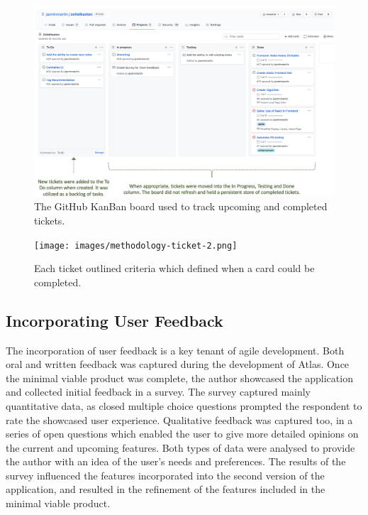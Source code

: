 \documentclass{article}
\begin{document}
\begin{figure}[!htb]
  \centering
      \includegraphics[width=1\textwidth]{images/methodology-ticket.png}
  \caption{The GitHub KanBan board used to track upcoming and completed tickets.}
\end{figure}

\begin{figure}[!htb]
  \centering
      \texttt{[image: images/methodology-ticket-2.png]}
  \caption{Each ticket outlined criteria which defined when a card could be completed.}
\end{figure}

\subsection{Incorporating User Feedback}

The incorporation of user feedback is a key tenant of agile development. Both oral and written feedback was captured during the development of Atlas. Once the minimal viable product was complete, the author showcased the application and collected initial feedback in a survey. The survey captured mainly quantitative data, as closed multiple choice questions prompted the respondent to rate the showcased user experience. Qualitative feedback was captured too, in a series of open questions which enabled the user to give more detailed opinions on the current and upcoming features. Both types of data were analysed to provide the author with an idea of the user’s needs and preferences. The results of the survey influenced the features incorporated into the second version of the application, and resulted in the refinement of the features included in the minimal viable product.
\end{document}
